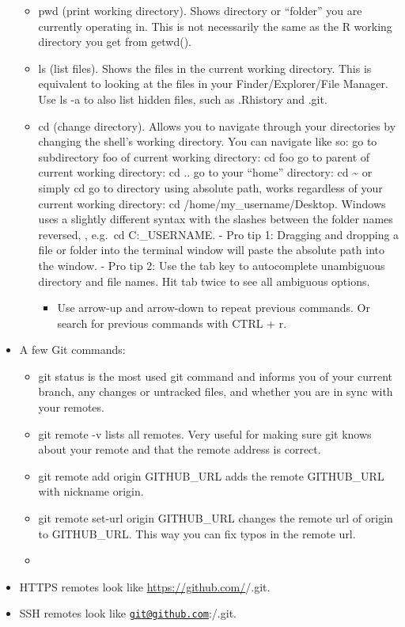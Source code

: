 \documentclass[
]{article}
\providecommand{\tightlist}{%
  \setlength{\itemsep}{0pt}\setlength{\parskip}{0pt}}
\begin{document}
\begin{itemize}
  \begin{itemize}
  \item
    pwd (print working directory). Shows directory or ``folder'' you
    are currently operating in. This is not necessarily the same as
    the R working directory you get from getwd().
  \item
    ls (list files). Shows the files in the current working
    directory. This is equivalent to looking at the files in your
    Finder/Explorer/File Manager. Use ls -a to also list hidden
    files, such as .Rhistory and .git.
  \item
    cd (change directory). Allows you to navigate through your
    directories by changing the shell's working directory. You can
    navigate like so: go to subdirectory foo of current working
    directory: cd foo go to parent of current working directory: cd
    .. go to your ``home'' directory: cd \textasciitilde{} or simply cd go to
    directory using absolute path, works regardless of your current
    working directory: cd /home/my\_username/Desktop. Windows uses a
    slightly different syntax with the slashes between the folder
    names reversed, , e.g.~cd C:\Users\MY\_USERNAME\Desktop. - Pro
    tip 1: Dragging and dropping a file or folder into the terminal
    window will paste the absolute path into the window. - Pro tip
    2: Use the tab key to autocomplete unambiguous directory and
    file names. Hit tab twice to see all ambiguous options.

    \begin{itemize}
    \tightlist
    \item
      Use arrow-up and arrow-down to repeat previous commands. Or
      search for previous commands with CTRL + r.
    \end{itemize}
  \end{itemize}
\item
  A few Git commands:

  \begin{itemize}
  \tightlist
  \item
    git status is the most used git command and informs you of your
    current branch, any changes or untracked files, and whether you
    are in sync with your remotes.
  \item
    git remote -v lists all remotes. Very useful for making sure git
    knows about your remote and that the remote address is correct.
  \item
    git remote add origin GITHUB\_URL adds the remote GITHUB\_URL with
    nickname origin.
  \item
    git remote set-url origin GITHUB\_URL changes the remote url of
    origin to GITHUB\_URL. This way you can fix typos in the remote
    url.
  \item
  \end{itemize}
\item
  HTTPS remotes look like \url{https://github.com/}/.git.
\item
  SSH remotes look like
  \href{mailto:git@github.com}{\nolinkurl{git@github.com}}:/.git.


\end{itemize}
\end{document}
